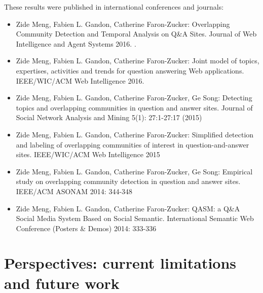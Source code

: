 
These results were published in international conferences and journals:

\begin{itemize}

\item{Zide Meng, Fabien L. Gandon, Catherine Faron-Zucker: Overlapping Community Detection and Temporal Analysis on Q\&A Sites. Journal of Web Intelligence and Agent Systems 2016. }. 

\item{Zide Meng, Fabien L. Gandon, Catherine Faron-Zucker: Joint model of topics, expertises, activities and trends for question answering Web applications. IEEE/WIC/ACM Web Intelligence 2016.}

\item{Zide Meng, Fabien L. Gandon, Catherine Faron-Zucker, Ge Song: Detecting topics and overlapping communities in question and answer sites. Journal of Social Network Analysis and Mining 5(1): 27:1-27:17 (2015)}


\item{Zide Meng, Fabien L. Gandon, Catherine Faron-Zucker: Simplified detection and labeling of overlapping communities of interest in question-and-answer sites. IEEE/WIC/ACM Web Intelligence 2015}


\item{Zide Meng, Fabien L. Gandon, Catherine Faron-Zucker, Ge Song: Empirical study on overlapping community detection in question and answer sites. IEEE/ACM ASONAM 2014: 344-348}

\item{Zide Meng, Fabien L. Gandon, Catherine Faron-Zucker: QASM: a Q\&A Social Media System Based on Social Semantic. International Semantic Web Conference (Posters \& Demos) 2014: 333-336}
\end{itemize}

\section{Perspectives: current limitations and future work}

